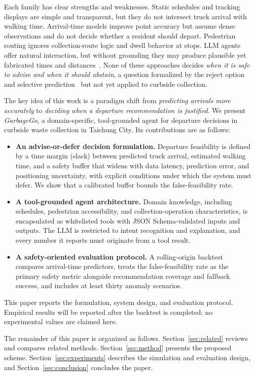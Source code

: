 Each family has clear strengths and weaknesses. Static schedules and tracking displays are simple and transparent, but they do not intersect truck arrival with walking time. Arrival-time models improve point accuracy but assume dense observations and do not decide whether a resident should depart. Pedestrian routing ignores collection-route logic and dwell behavior at stops. LLM agents offer natural interaction, but without grounding they may produce plausible yet fabricated times and distances~\cite{ji2023hallucination}. None of these approaches decides \emph{when it is safe to advise and when it should abstain}, a question formalized by the reject option~\cite{chow1970} and selective prediction~\cite{geifman2017} but not yet applied to curbside collection.

The key idea of this work is a paradigm shift from \emph{predicting arrivals more accurately} to \emph{deciding when a departure recommendation is justified}. We present \emph{GarbageGo}, a domain-specific, tool-grounded agent for departure decisions in curbside waste collection in Taichung City. Its contributions are as follows:
\begin{itemize}
\item \textbf{An advise-or-defer decision formulation.} Departure feasibility is defined by a time margin (slack) between predicted truck arrival, estimated walking time, and a safety buffer that widens with data latency, prediction error, and positioning uncertainty, with explicit conditions under which the system must defer. We show that a calibrated buffer bounds the false-feasibility rate.
\item \textbf{A tool-grounded agent architecture.} Domain knowledge, including schedules, pedestrian accessibility, and collection-operation characteristics, is encapsulated as whitelisted tools with JSON Schema-validated inputs and outputs. The LLM is restricted to intent recognition and explanation, and every number it reports must originate from a tool result.
\item \textbf{A safety-oriented evaluation protocol.} A rolling-origin backtest compares arrival-time predictors, treats the false-feasibility rate as the primary safety metric alongside recommendation coverage and fallback success, and includes at least thirty anomaly scenarios.
\end{itemize}
This paper reports the formulation, system design, and evaluation protocol. Empirical results will be reported after the backtest is completed; no experimental values are claimed here.

The remainder of this paper is organized as follows. Section~\ref{sec:related} reviews and compares related methods. Section~\ref{sec:method} presents the proposed scheme. Section~\ref{sec:experiments} describes the simulation and evaluation design, and Section~\ref{sec:conclusion} concludes the paper.
